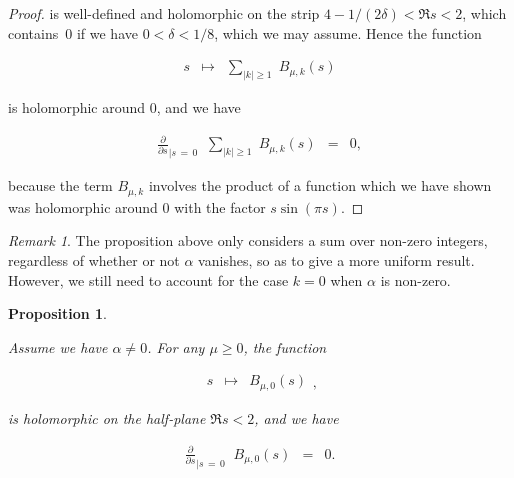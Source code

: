 \documentclass{jams-l}
\newtheorem{proposition}[theorem]{Proposition}
\theoremstyle{definition}
\theoremstyle{remark}
\newtheorem{remark}[theorem]{Remark}
\numberwithin{equation}{section}
\begin{document}
\begin{proof}
                \noindent is well-defined and holomorphic on the strip $4-1/\left( 2 \delta \right) < \Re s < 2$, which contains~$0$ if we have $0 < \delta < 1/8$, which we may assume. Hence the function
            
                \[ \begin{array}{lll}
                        \displaystyle s & \longmapsto & \displaystyle \sum\limits_{\left \vert k \right \vert \geqslant 1} \; B_{\mu,k} \left( s \right)
                    \end{array} \]
            
                \noindent is holomorphic around $0$, and we have
            
                \[ \begin{array}{lll}
                        \displaystyle \frac{\partial}{\partial s}_{\vert s \, = \, 0} \; \; \sum\limits_{\left \vert k \right \vert \geqslant 1} \; B_{\mu,k} \left( s \right) & = & \displaystyle 0,
                    \end{array} \]
            
                \noindent because the term $B_{\mu,k}$ involves the product of a function which we have shown was holomorphic around $0$ with the factor $s \sin \left( \pi s \right)$.
            
            \end{proof}
            
            \begin{remark}
            
                The proposition above only considers a sum over non-zero integers, regardless of whether or not $\alpha$ vanishes, so as to give a more uniform result. However, we still need to account for the case $k=0$ when $\alpha$ is non-zero.
            
            \end{remark}
            
            \begin{proposition}
            \label{PropBmu0}
        
                Assume we have $\alpha \neq 0$. For any $\mu \geqslant 0$, the function
            
                \[ \begin{array}{ccc}
                        \displaystyle s & \longmapsto & \displaystyle B_{\mu,0} \left( s \right)
                    \end{array} , \]
            
                \noindent is holomorphic on the half-plane $\Re s < 2$, and  we have
            
                \[ \begin{array}{ccc}
                        \displaystyle \frac{\partial}{\partial s}_{\vert s \, = \, 0} \; \; B_{\mu,0} \left( s \right) & = & \displaystyle 0.
                    \end{array} \]
        
            \end{proposition}
        
\end{document}

